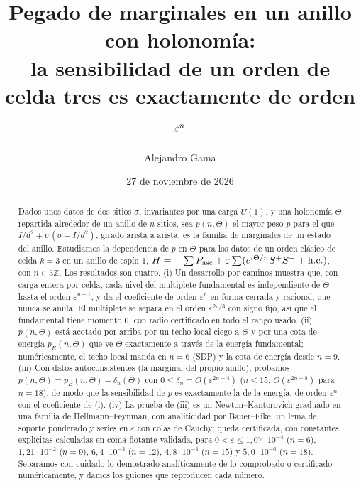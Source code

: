 \documentclass[11pt,a4paper]{article}
\title{Pegado de marginales en un anillo con holonomía:\\
la sensibilidad de un orden de celda tres es exactamente de orden $\eps^{n}$}
\author{Alejandro Gama}
\date{27 de noviembre de 2026}
\theoremstyle{definition}
\theoremstyle{remark}
\newcommand{\eps}{\varepsilon}
\newcommand{\pE}{p_{E}}
\begin{document}
\maketitle

\begin{abstract}
Dados unos datos de dos sitios $\sigma$, invariantes por una carga $U(1)$, y una holonomía $\Theta$
repartida alrededor de un anillo de $n$ sitios, sea $p(n,\Theta)$ el mayor peso $p$ para el que
$I/d^2+p\,(\sigma-I/d^2)$, girado arista a arista, es la familia de marginales de un estado del anillo.
Estudiamos la dependencia de $p$ en $\Theta$ para los datos de un orden clásico de celda $k=3$ en un
anillo de espín $1$, $H=-\sum P_{\rm asc}+\eps\sum(e^{i\Theta/n}S^+S^-+\text{h.c.})$, con $n\in3\mathbb Z$.
Los resultados son cuatro. (i) Un desarrollo por caminos muestra que, con carga entera por celda, cada
nivel del multiplete fundamental es independiente de $\Theta$ hasta el orden $\eps^{n-1}$, y da el
coeficiente de orden $\eps^{n}$ en forma cerrada y racional, que nunca se anula. El multiplete se separa en
el orden $\eps^{2n/3}$ con signo fijo, así que el fundamental tiene momento $0$, con radio certificado en
todo el rango usado. (ii) $p(n,\Theta)$ está acotado por arriba
por un techo local ciego a $\Theta$ y por una cota de energía $\pE(n,\Theta)$ que ve $\Theta$ exactamente
a través de la energía fundamental; numéricamente, el techo local manda en $n=6$ (SDP) y la cota de energía desde $n=9$. (iii) Con datos autoconsistentes (la marginal del propio anillo), probamos
$p(n,\Theta)=\pE(n,\Theta)-\delta_n(\Theta)$ con $0\le\delta_n=O(\eps^{2n-4})$ ($n\le15$; $O(\eps^{2n-8})$ para
$n=18$), de modo que la
sensibilidad de $p$ es exactamente la de la energía, de orden $\eps^n$ con el coeficiente de (i).
(iv) La prueba de (iii) es un Newton--Kantorovich graduado en una familia de Hellmann--Feynman, con
analiticidad por Bauer--Fike, un lema de soporte ponderado y series en $\eps$ con colas de Cauchy;
queda certificada, con constantes explícitas calculadas en coma flotante validada, para
$0<\eps\le1{,}07\cdot10^{-4}$ ($n=6$), $1{,}21\cdot10^{-2}$ ($n=9$), $6{,}4\cdot10^{-3}$ ($n=12$),
$4{,}8\cdot10^{-3}$ ($n=15$) y $5{,}0\cdot10^{-6}$ ($n=18$). Separamos con cuidado lo demostrado
analíticamente de lo comprobado o certificado numéricamente, y damos los guiones que reproducen cada
número.
\end{abstract}

\tableofcontents

\end{document}
